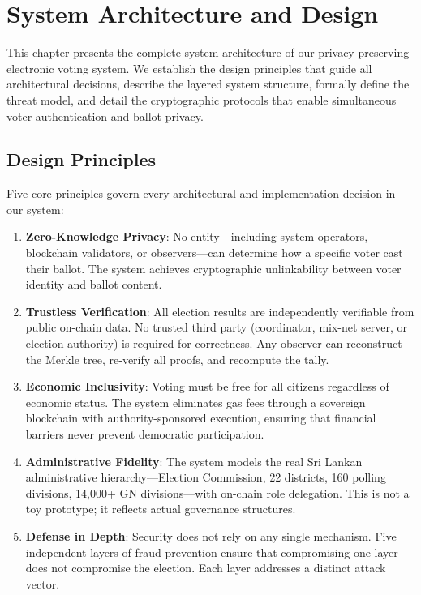 \chapter{System Architecture and Design}\label{ch:architecture}

This chapter presents the complete system architecture of our privacy-preserving electronic voting system. We establish the design principles that guide all architectural decisions, describe the layered system structure, formally define the threat model, and detail the cryptographic protocols that enable simultaneous voter authentication and ballot privacy.

\section{Design Principles}

Five core principles govern every architectural and implementation decision in our system:

\begin{enumerate}[label=\textbf{P\arabic*}]
    \item \textbf{Zero-Knowledge Privacy}: No entity---including system operators, blockchain validators, or observers---can determine how a specific voter cast their ballot. The system achieves cryptographic unlinkability between voter identity and ballot content.
    
    \item \textbf{Trustless Verification}: All election results are independently verifiable from public on-chain data. No trusted third party (coordinator, mix-net server, or election authority) is required for correctness. Any observer can reconstruct the Merkle tree, re-verify all proofs, and recompute the tally.
    
    \item \textbf{Economic Inclusivity}: Voting must be free for all citizens regardless of economic status. The system eliminates gas fees through a sovereign blockchain with authority-sponsored execution, ensuring that financial barriers never prevent democratic participation.
    
    \item \textbf{Administrative Fidelity}: The system models the real Sri Lankan administrative hierarchy---Election Commission, 22 districts, 160 polling divisions, 14,000+ GN divisions---with on-chain role delegation. This is not a toy prototype; it reflects actual governance structures.
    
    \item \textbf{Defense in Depth}: Security does not rely on any single mechanism. Five independent layers of fraud prevention ensure that compromising one layer does not compromise the election. Each layer addresses a distinct attack vector.
\end{enumerate}

